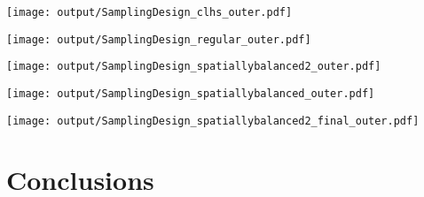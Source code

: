 \documentclass[a4paper]{article}
\let\origfigure=\figure
\let\endorigfigure=\endfigure
\renewenvironment{figure}[1][]{%
   \origfigure[H]
}{%
   \endorigfigure
}
\begin{document}
\begin{figure}
\centering\scriptsize\scriptsize
\texttt{[image: output/SamplingDesign\_clhs\_outer.pdf]}
\caption{Sampling configurations associated with the lowest mean Error
for each sample size for cLHS for the Outer
Harbour\label{fig:SamplingDesign_clhs_outer}}
\end{figure}

\begin{figure}
\centering\scriptsize\scriptsize
\texttt{[image: output/SamplingDesign\_regular\_outer.pdf]}
\caption{Sampling configurations associated with the lowest mean Error
for each sample size for Regular grid sampling for the Outer
Harbour\label{fig:SamplingDesign_regular_outer}}
\end{figure}

\begin{figure}
\centering\scriptsize\scriptsize
\texttt{[image: output/SamplingDesign\_spatiallybalanced2\_outer.pdf]}
\caption{Sampling configurations associated with the lowest mean Error
for each sample size for nD Spatially balanced sampling for the Outer
Harbour\label{fig:SamplingDesign_spatiallybalanced2_outer}}
\end{figure}

\begin{figure}
\centering\scriptsize\scriptsize
\texttt{[image: output/SamplingDesign\_spatiallybalanced\_outer.pdf]}
\caption{Sampling configurations associated with the lowest mean Error
for each sample size for 2D Spatially balanced sampling for the Outer
Harbour\label{fig:SamplingDesign_spatiallybalanced_outer}}
\end{figure}

\begin{figure}
\centering\scriptsize\scriptsize
\texttt{[image: output/SamplingDesign\_spatiallybalanced2\_final\_outer.pdf]}
\caption{Two dimensional spatially balanced sampling configuration for
the Outer Harbour (100
samples)\label{fig:SamplingDesign_spatiallybalanced2_final_outer}}
\end{figure}

\hypertarget{conclusions}{%
\section{Conclusions}\label{conclusions}}
\end{document}
